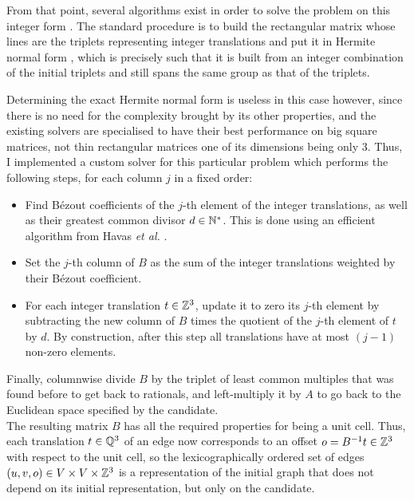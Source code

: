\documentclass[main.tex]{subfiles}
\begin{document}
From that point, several algorithms exist in order to solve the problem on this integer form \autocite{sparseLinearRational,blackbox,Dixon,Wiedemann}. The standard procedure is to build the rectangular matrix whose lines are the triplets representing integer translations and put it in Hermite normal form \autocite{gcd}, which is precisely such that it is built from an integer combination of the initial triplets and still spans the same group as that of the triplets.

Determining the exact Hermite normal form is useless in this case however, since there is no need for the complexity brought by its other properties, and the existing solvers are specialised to have their best performance on big square matrices, not thin rectangular matrices one of its dimensions being only 3. Thus, I implemented a custom solver for this particular problem which performs the following steps, for each column $j$ in a fixed order:
\begin{itemize}[noitemsep]
	\item Find B\'{e}zout coefficients of the $j$-th element of the integer translations, as well as their greatest common divisor $d\in\mathbb{N}^*$. This is done using an efficient algorithm from Havas \textit{et al.} \autocite{gcd}.
	\item Set the $j$-th column of $B$ as the sum of the integer translations weighted by their B\'{e}zout coefficient. %
	\item For each integer translation $t\in\mathbb{Z}^3$, update it to zero its $j$-th element by subtracting the new column of $B$ times the quotient of the $j$-th element of $t$ by $d$. By construction, after this step all translations have at most $(j-1)$ non-zero elements.
\end{itemize}
Finally, columnwise divide $B$ by the triplet of least common multiples that was found before to get back to rationals, and left-multiply it by $A$ to go back to the Euclidean space specified by the candidate.\\

The resulting matrix $B$ has all the required properties for being a unit cell. Thus, each translation $t\in\mathbb{Q}^3$ of an edge now corresponds to an offset $o = B^{-1}t\in\mathbb{Z}^3$ with respect to the unit cell, so the lexicographically ordered set of edges $(u,v,o)\in V\times V\times\mathbb{Z}^3$ is a representation of the initial graph that does not depend on its initial representation, but only on the candidate.
\end{document}
